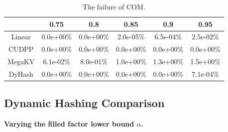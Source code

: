\begin{table}[H]
	\caption{The failure of COM.}
	\centering
	\begin{tabular}{|c|c|c|c|c|c|}
		\hline
		           & 0.75 & 0.8 & 0.85 & 0.9 & 0.95\\ \hline
		Linear &0.0e+00\% & 0.0e+00\% &2.0e-05\%  & 6.5e-04\% & 2.5e-02\% \\ \hline
		CUDPP & 0.0e+00\% & 0.0e+00\% &0.0e+00\%  & 0.0e+00\% & 0.0e+00\% \\ \hline
		MegaKV &6.1e-02\% & 8.0e-01\% &1.0e+00\%  & 1.3e+00\% & 1.5e+00\% \\ \hline
		DyHash &0.0e+00\% & 0.0e+00\% &0.0e+00\%  & 0.0e+00\% & 7.1e-04\% \\ \hline
	\end{tabular}
	\label{tab:fail:com}
\end{table}


\subsection{Dynamic Hashing Comparison}\label{sec:exp:dynamic}

\vspace{1mm}\noindent\textbf{Varying the filled factor lower bound $\alpha$.}

